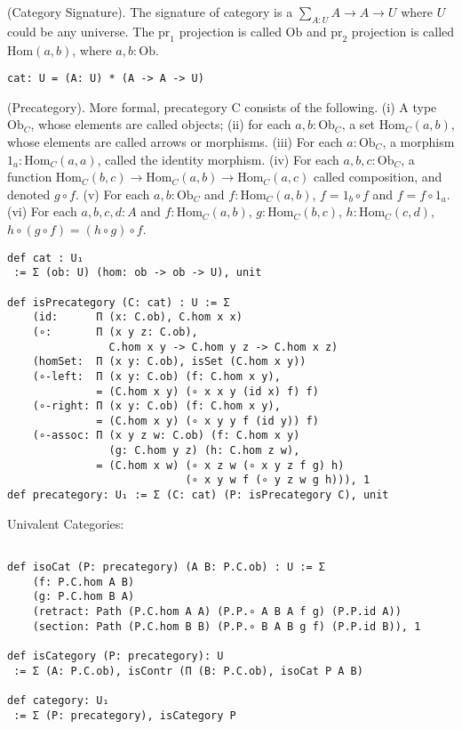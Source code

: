 \documentclass{article}
\begin{document}
\begin{definition} (Category Signature). The signature of category is
a $\sum_{A:U}A \rightarrow A \rightarrow U$ where $U$ could be any universe.
The $\mathrm{pr}_1$ projection is called $\mathrm{Ob}$ and $\mathrm{pr}_2$ projection is
called $\mathrm{Hom}(a,b)$, where $a,b:\mathrm{Ob}$.
\begin{lstlisting}
cat: U = (A: U) * (A -> A -> U)
\end{lstlisting}
\end{definition}

\begin{definition} (Precategory). More formal, precategory $\mathrm{C}$ consists of the following.
(i) A type $\mathrm{Ob}_C$, whose elements are called objects;
(ii) for each $a,b: \mathrm{Ob}_C$, a set $\mathrm{Hom}_C(a,b)$, whose elements are called arrows or morphisms.
(iii) For each $a: \mathrm{Ob}_C$, a morphism $1_a : \mathrm{Hom}_C(a,a)$, called the identity morphism.
(iv) For each $a,b,c: \mathrm{Ob}_C$, a function
     $\mathrm{Hom}_C(b,c) \rightarrow \mathrm{Hom}_C(a,b) \rightarrow \mathrm{Hom}_C(a,c)$
     called composition, and denoted $g \circ f$.
(v) For each $a,b: \mathrm{Ob}_C$ and $f: \mathrm{Hom}_C(a,b)$, $f = 1_b \circ f$ and $f = f \circ 1_a$.
(vi) For each $a,b,c,d: A$ and $f: \mathrm{Hom}_C(a,b)$, $g: \mathrm{Hom}_C(b,c)$, $h: \mathrm{Hom}_C(c,d)$,
     $h \circ (g \circ f ) = (h \circ g) \circ f$.
\begin{lstlisting}
def cat : U₁
 := Σ (ob: U) (hom: ob -> ob -> U), unit

def isPrecategory (C: cat) : U := Σ
    (id:      Π (x: C.ob), C.hom x x)
    (∘:       Π (x y z: C.ob),
                C.hom x y -> C.hom y z -> C.hom x z)
    (homSet:  Π (x y: C.ob), isSet (C.hom x y))
    (∘-left:  Π (x y: C.ob) (f: C.hom x y),
              = (C.hom x y) (∘ x x y (id x) f) f)
    (∘-right: Π (x y: C.ob) (f: C.hom x y),
              = (C.hom x y) (∘ x y y f (id y)) f)
    (∘-assoc: Π (x y z w: C.ob) (f: C.hom x y)
                (g: C.hom y z) (h: C.hom z w),
              = (C.hom x w) (∘ x z w (∘ x y z f g) h)
                            (∘ x y w f (∘ y z w g h))), 1
def precategory: U₁ := Σ (C: cat) (P: isPrecategory C), unit

\end{lstlisting}

\newpage
Univalent Categories:

\begin{lstlisting}

def isoCat (P: precategory) (A B: P.C.ob) : U := Σ
    (f: P.C.hom A B)
    (g: P.C.hom B A)
    (retract: Path (P.C.hom A A) (P.P.∘ A B A f g) (P.P.id A))
    (section: Path (P.C.hom B B) (P.P.∘ B A B g f) (P.P.id B)), 1

def isCategory (P: precategory): U
 := Σ (A: P.C.ob), isContr (Π (B: P.C.ob), isoCat P A B)

def category: U₁
 := Σ (P: precategory), isCategory P
\end{lstlisting}
\end{definition}
\end{document}

